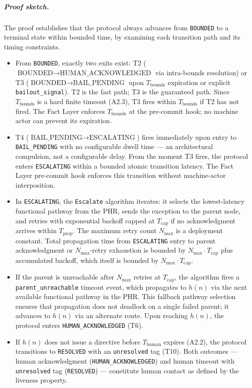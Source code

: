\subparagraph{Proof sketch.} The proof establishes that the protocol always advances from \texttt{BOUNDED} to a terminal state within bounded time, by examining each transition path and its timing constraints.

\begin{itemize}
\item[\textbf{Step 1.}] From \texttt{BOUNDED}, exactly two exits exist: T2 ($\text{BOUNDED} \rightarrow \text{HUMAN\_ACKNOWLEDGED}$ via intra-bounds resolution) or T3 ($\text{BOUNDED} \rightarrow \text{BAIL\_PENDING}$ upon $T_{\text{bounds}}$ expiration or explicit \texttt{bailout\_signal}). T2 is the fast path; T3 is the guaranteed path. Since $T_{\text{bounds}}$ is a hard finite timeout (A2.3), T3 fires within $T_{\text{bounds}}$ if T2 has not fired. The Fact Layer enforces $T_{\text{bounds}}$ at the pre-commit hook; no machine actor can prevent its expiration.

\item[\textbf{Step 2.}] T4 ($\text{BAIL\_PENDING} \rightarrow \text{ESCALATING}$) fires immediately upon entry to \texttt{BAIL\_PENDING} with no configurable dwell time — an architectural compulsion, not a configurable delay. From the moment T3 fires, the protocol enters \texttt{ESCALATING} within a bounded atomic transition latency. The Fact Layer pre-commit hook enforces this transition without machine-actor interposition.

\item[\textbf{Step 3.}] In \texttt{ESCALATING}, the \texttt{Escalate} algorithm iterates: it selects the lowest-latency functional pathway from the PHR, sends the exception to the parent node, and retries with exponential backoff capped at $T_{\text{cap}}$ if no acknowledgment arrives within $T_{\text{prop}}$. The maximum retry count $N_{\max}$ is a deployment constant. Total propagation time from \texttt{ESCALATING} entry to parent acknowledgment or $N_{\max}$-retry exhaustion is bounded by $N_{\max} \cdot T_{\text{cap}}$ plus accumulated backoff, which itself is bounded by $N_{\max} \cdot T_{\text{cap}}$.

\item[\textbf{Step 4.}] If the parent is unreachable after $N_{\max}$ retries at $T_{\text{cap}}$, the algorithm fires a \texttt{parent\_unreachable} timeout event, which propagates to $h(n)$ via the next available functional pathway in the PHR. This fallback pathway selection ensures that propagation does not deadlock on a single failed parent; it advances to $h(n)$ via an alternate route. Upon reaching $h(n)$, the protocol enters \texttt{HUMAN\_ACKNOWLEDGED} (T6).

\item[\textbf{Step 5.}] If $h(n)$ does not issue a directive before $T_{\text{human}}$ expires (A2.2), the protocol transitions to \texttt{RESOLVED} with an \texttt{unresolved} tag (T10). Both outcomes — human acknowledgment (\texttt{HUMAN\_ACKNOWLEDGED}) and human timeout with \texttt{unresolved} tag (\texttt{RESOLVED}) — constitute human contact as defined by the liveness property.
\end{itemize}


